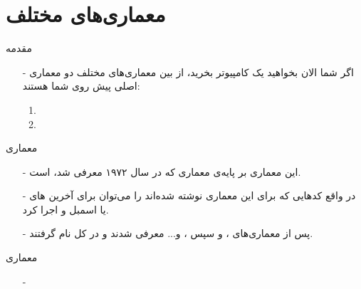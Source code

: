 \section{معماری‌های مختلف}
\begin{frame}{مقدمه}
\begin{itemize}\itemr
\item[-]
اگر شما الان بخواهید یک کامپیوتر بخرید، از بین معماری‌های مختلف دو معماری اصلی پیش روی شما هستند:
\begin{enumerate}\itemr
\item {}
\item {}
\end{enumerate}
\end{itemize}
\end{frame}

\begin{frame}{معماری }
\begin{itemize}\itemr
\item[-]
این معماری بر پایه‌ی معماری 
که در سال ۱۹۷۲ معرفی شد، است.
\item[-]
در واقع کد‌هایی که برای این معماری نوشته شده‌اند را می‌توان برای آخرین 
های
یا
اسمبل و اجرا کرد.
\item[-]
پس از
معماری‌های
،
 و سپس
،
و... معرفی شدند و در کل 
نام گرفتند.
\end{itemize}
\end{frame}

\begin{frame}{معماری }
\begin{itemize}\itemr
\item[-]

\end{itemize}
\end{frame}